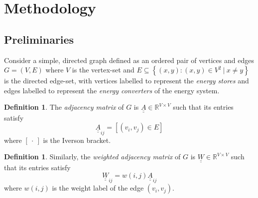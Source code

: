 \documentclass[]{article}
\def \mat#1{\underline{\underline{#1}}}
\numberwithin{equation}{section}
\theoremstyle{plain} %
\theoremstyle{definition}
\newtheorem{defn}[equation]{Definition}
\theoremstyle{remark}
\begin{document}
\section{Methodology}
\subsection{Preliminaries}
Consider a simple, directed graph defined as an ordered pair of vertices and edges $G = (V, E)$
where $V$ is the vertex-set and $E\subseteq\left \{(x,y):(x,y)\in V^2\ |\ x\neq y\right \}$ is the directed edge-set, with vertices labelled to represent the \emph{energy stores}
and edges labelled to represent the \emph{energy converters} of the energy system.
\begin{defn}
    The \emph{adjacency matrix} of $G$ is $\mat A\in\mathbb{R}^{V\times V}$ such that its entries satisfy
    $$\mat A_{ij} = \left [(v_i, v_j)\in E \right ]$$
    where $[\ \cdot\ ]$ is the Iverson bracket.
\end{defn}
\begin{defn}
    Similarly, the \emph{weighted adjacency matrix} of $G$ is $\mat W\in\mathbb{R}^{V\times V}$ such that its entries satisfy
    $$\mat W_{ij} = w(i, j)\mat A_{ij}$$
    where $w(i, j)$ is the weight label of the edge $(v_i, v_j)$.
\end{defn}
\end{document}
